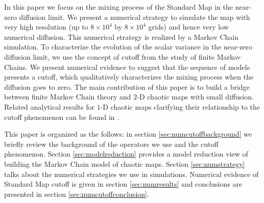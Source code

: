   

In this paper we focus on the mixing process of the Standard Map in
the near-zero diffusion limit. We present a numerical strategy to
simulate the map with very high resolution (up to $8 \times 10^4$ by
$8 \times 10^4$ grids) and hence very low numerical diffusion. This
numerical strategy is realized by a Markov Chain simulation. To
characterize the evolution of the scalar variance in the near-zero
diffusion limit, we use the concept of cutoff from the study of finite
Markov Chains. We present numerical evidence to suggest that the
sequence of models presents a cutoff, which qualitatively
characterizes the mixing process when the diffusion goes to zero. The
main contribution of this paper is to build a bridge between finite
Markov Chain theory and $2$-D chaotic maps with small
diffusion. Related analytical results for $1$-D chaotic maps
clarifying their relationship to the cutoff phenomenon can be found in
\cite{symdyn}.

This paper is organized as the follows: in section
\ref{sec:numcutoffbackground} we briefly review the background of the
operators we use and the cutoff phenomenon. Section
\ref{sec:modelreduction} provides a model reduction view of building
the Markov Chain model of chaotic maps. Section \ref{sec:numstrategy}
talks about the numerical strategies we use in simulations. Numerical
evidence of Standard Map cutoff is given in section
\ref{sec:numresults} and conclusions are presented in section
\ref{sec:numcutoffconclusion}.

